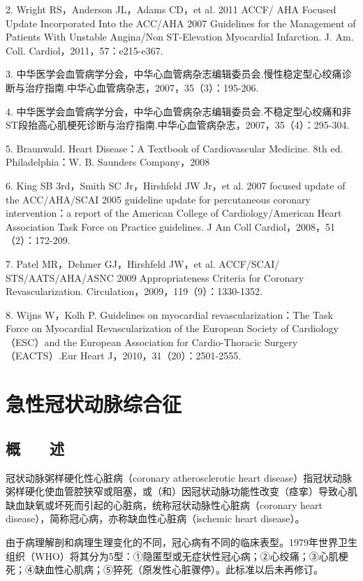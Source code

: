 2. Wright RS，Anderson JL，Adams CD，et al. 2011 ACCF/ AHA Focused
Update Incorporated Into the ACC/AHA 2007 Guidelines for the Management
of Patients With Unstable Angina/Non ST-Elevation Myocardial Infarction.
J. Am. Coll. Cardiol，2011，57：e215-e367.

3.
中华医学会血管病学分会，中华心血管病杂志编辑委员会.慢性稳定型心绞痛诊断与治疗指南.中华心血管病杂志，2007，35（3）：195-206.

4.
中华医学会血管病学分会，中华心血管病杂志编辑委员会.不稳定型心绞痛和非ST段抬高心肌梗死诊断与治疗指南.中华心血管病杂志，2007，35（4）：295-304.

5. Braunwald. Heart Disease：A Textbook of Cardiovascular Medicine. 8th
ed. Philadelphia：W. B. Saunders Company，2008

6. King SB 3rd，Smith SC Jr，Hirshfeld JW Jr，et al. 2007 focused update
of the ACC/AHA/SCAI 2005 guideline update for percutaneous coronary
intervention：a report of the American College of Cardiology/American
Heart Association Task Force on Practice guidelines. J Am Coll
Cardiol，2008，51（2）：172-209.

7. Patel MR，Dehmer GJ，Hirshfeld JW，et al. ACCF/SCAI/
STS/AATS/AHA/ASNC 2009 Appropriateness Criteria for Coronary
Revascularization. Circulation，2009，119（9）：1330-1352.

8. Wijns W，Kolh P. Guidelines on myocardial revascularization：The Task
Force on Myocardial Revascularization of the European Society of
Cardiology（ESC）and the European Association for Cardio-Thoracic
Surgery（EACTS）.Eur Heart J，2010，31（20）：2501-2555.

\protect\hypertarget{text00311.html}{}{}

\chapter{急性冠状动脉综合征}

\section{概　　述}

冠状动脉粥样硬化性心脏病（coronary atherosclerotic heart
disease）指冠状动脉粥样硬化使血管腔狭窄或阻塞，或（和）因冠状动脉功能性改变（痉挛）导致心肌缺血缺氧或坏死而引起的心脏病，统称冠状动脉性心脏病（coronary
heart disease），简称冠心病，亦称缺血性心脏病（ischemic heart
disease）。

由于病理解剖和病理生理变化的不同，冠心病有不同的临床表型。1979年世界卫生组织（WHO）将其分为5型：①隐匿型或无症状性冠心病；②心绞痛；③心肌梗死；④缺血性心肌病；⑤猝死（原发性心脏骤停）。此标准以后未再修订。

